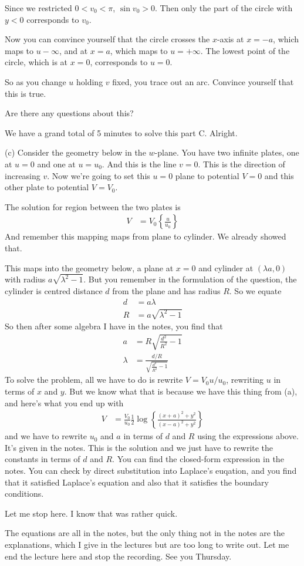 Since we restricted $0< v_0 < \pi$,
$\sin v_0 > 0$.
Then only the part of the circle with $y<0$
corresponds to $v_0$.

Now you can convince yourself that the circle crosses the $x$-axis at
$x=-a$,
which maps to $u-\infty$,
and at $x=a$,
which maps to $u=+\infty$.
The lowest point of the circle,
which is at $x=0$,
corresponds to $u=0$.

So as you change $u$ holding $v$ fixed,
you trace out an arc.
Convince yourself that this is true.

Are there any questions about this?

We have a grand total of 5 minutes to solve this part C.
Alright.

(c) Consider the geometry below in the $w$-plane.
You have two infinite plates,
one at $u=0$ and one at $u=u_0$.
And this is the line $v=0$.
This is the direction of increasing $v$.
Now we're going to set this $u=0$ plane to potential
$V=0$
and this other plate to potential
$V=V_0$.

The solution for region between the two plates is
\begin{align}
    V &= V_0\left\{
        \frac{u}{u_0}
    \right\}
\end{align}
And remember this mapping maps from plane to cylinder.
We already showed that.

This maps into the geometry below,
a plane at $x=0$
and cylinder at $(\lambda a, 0)$
with radius $a\sqrt{\lambda^2 - 1}$.
But you remember in the formulation of the question,
the cylinder is centred distance $d$ from the plane
and has radius $R$.
So we equate
\begin{align}
    d &= a \lambda\\
    R &= a\sqrt{\lambda^2 - 1}
\end{align}
So then after some algebra I have in the notes,
you find that
\begin{align}
    a &=
    R \sqrt{\frac{d^2}{R^2} - 1}\\
    \lambda &=
    \frac{d/R}{\sqrt{\frac{d^2}{R^2} - 1}}
\end{align}
To solve the problem,
all we have to do is rewrite $V=V_0 u/u_0$,
rewriting $u$ in terms of $x$ and $y$.
But we know what that is because we have this thing from (a),
and here's what you end up with
\begin{align}
    V &= \frac{V_0}{u_0} \frac{1}{2}
    \log\left\{
        \frac{(x + a)^2 + y^2}{(x - a)^2 + y^2}
    \right\}
\end{align}
and we have to rewrite $u_0$ and $a$ in terms of
$d$ and $R$ using the expressions above.
It's given in the notes.
This is the solution
and we just have to rewrite the constants in terms of $d$ and $R$.
You can find the closed-form expression in the notes.
You can check by direct substitution into Laplace's euqation,
and you find that it satisfied Laplace's equation and also
that it satisfies the boundary conditions.

Let me stop here.
I know that was rather quick.

The equations are all in the notes,
but the only thing not in the notes are the explanations,
which I give in the lectures but are too long to write out.
Let me end the lecture here and stop the recording.
See you Thursday.

